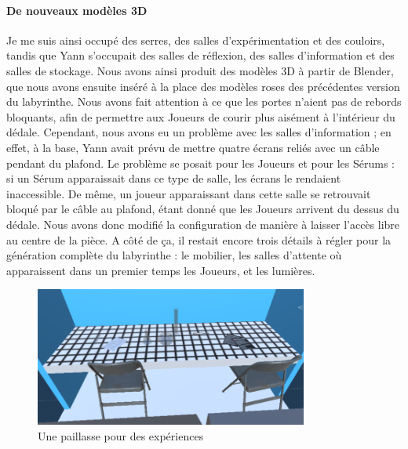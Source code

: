 \documentclass{article}
\begin{document}
\paragraph{De nouveaux modèles 3D}
Je me suis ainsi occupé des serres, des salles d'expérimentation et des couloirs, tandis que Yann s'occupait des salles de réflexion, des salles d'information et des salles de stockage. Nous avons ainsi produit des modèles 3D à partir de Blender, que nous avons ensuite inséré à la place des modèles roses des précédentes version du labyrinthe. Nous avons fait attention à ce que les portes n'aient pas de rebords bloquants, afin de permettre aux Joueurs de courir plus aisément à l'intérieur du dédale. Cependant, nous avons eu un problème avec les salles d'information ; en effet, à la base, Yann avait prévu de mettre quatre écrans reliés avec un câble pendant du plafond. Le problème se posait pour les Joueurs et pour les Sérums : si un Sérum apparaissait dans ce type de salle, les écrans le rendaient inaccessible. De même, un joueur apparaissant dans cette salle se retrouvait bloqué par le câble au plafond, étant donné que les Joueurs arrivent du dessus du dédale. Nous avons donc modifié la configuration de manière à laisser l'accès libre au centre de la pièce. A côté de ça, il restait encore trois détails à régler pour la génération complète du labyrinthe : le mobilier, les salles d'attente où apparaissent dans un premier temps les Joueurs, et les lumières.


\begin{figure}[H]
    \centering
    \includegraphics[width=0.8\textwidth]{labo2.png}
    \caption{Une paillasse pour des expériences}
    \label{Une paillasse pour des expériences}
\end{figure}
\end{document}
